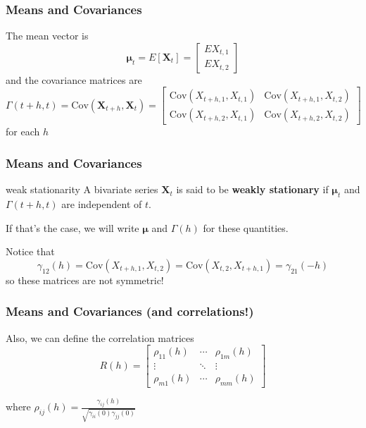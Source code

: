 \documentclass{beamer}
\begin{document}
\begin{frame}
\frametitle{Means and Covariances}

The mean vector is
\[
\bm{\mu}_t = 
E[\mathbf{X}_t] =
\left[\begin{array}{c}
EX_{t,1} \\
EX_{t,2}
\end{array}\right]
\]
and the covariance matrices are
\[
\Gamma(t+h,t) = \text{Cov}(\mathbf{X}_{t+h},\mathbf{X}_t) = 
\left[\begin{array}{cc}
\text{Cov}(X_{t+h,1}, X_{t,1}) & \text{Cov}(X_{t+h,1}, X_{t,2}) \\
\text{Cov}(X_{t+h,2}, X_{t,1}) & \text{Cov}(X_{t+h,2}, X_{t,2})
\end{array}\right]
\]
for each $h$

\end{frame}


\begin{frame}
\frametitle{Means and Covariances}

\begin{block}{weak stationarity}
A bivariate series $\mathbf{X}_t$ is said to be {\bf weakly stationary }if $\bm{\mu}_t$ and $\Gamma(t+h,t)$ are independent of $t$.
\end{block}

If that's the case, we will write $\bm{\mu}$ and $\Gamma(h)$ for these quantities. 
\newline

Notice that 
\[
\gamma_{12}(h) = \text{Cov}(X_{t+h,1},X_{t,2}) =\text{Cov}(X_{t,2}, X_{t+h,1})  = \gamma_{21}(-h)
\]
so these matrices are not symmetric!

\end{frame}

\begin{frame}
\frametitle{Means and Covariances (and correlations!)}

Also, we can define the correlation matrices
\[
R(h) = 
\left[\begin{array}{ccc}
\rho_{11}(h) & \cdots & \rho_{1m}(h)\\
\vdots & \ddots & \vdots \\
\rho_{m1}(h) & \cdots & \rho_{mm}(h)
\end{array}\right]
\]

where $\rho_{ij}(h) = \frac{\gamma_{ij}(h)}{\sqrt{\gamma_{ii}(0)\gamma_{jj}(0)}}$

\end{frame}
\end{document}
